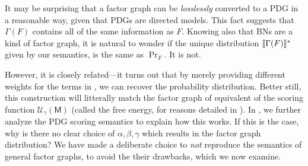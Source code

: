 \documentclass{article}
\theoremstyle{plain}
\newtheorem{coro}{Corollary}[theorem]
\theoremstyle{definition}
\theoremstyle{remark}
\DeclarePairedDelimiter{\bbr}{\llbracket}{\rrbracket}
\DeclarePairedDelimiter{\UD}{\llbracket}{\rrbracket^*}
\newcommand{\sfM}{\mathsf M}
\newcommand\PDGof{\Gamma}
\numberwithin{equation}{section}
\begin{document}

	It may be surprising that a factor graph can be \emph{losslessly} converted to a PDG in a reasonable way, given that PDGs are directed models.
 	This fact suggests that $\PDGof(F)$ contains all of the same information as $F$. Knowing also that BNs are a kind of factor graph, it is natural to wonder if the unique distribution $\UD{\PDGof(F)}$ given by our semantics, is the same as $\Pr_F$.		
		It is not. 
	
	
		
	However, it is closely related---it turns out that by merely providing different weights for the terms in , we can recover the probability distribution. Better still, this construction will litterally match the factor graph of equivalent of the scoring function $\mathcal U_\gamma(\sfM)$ (called the free energy, for reasons detailed in ).
%
		In , we further analyze the PDG scoring semantics to explain how this works.
		If this is the case, why is there no clear choice of $\alpha,\beta,\gamma$ which results in the factor graph distribution?  
		We have made a deliberate choice to \emph{not} reproduce the semantics of general factor graphs, to avoid the their drawbacks, which 
		we now examine.

	
\end{document}
